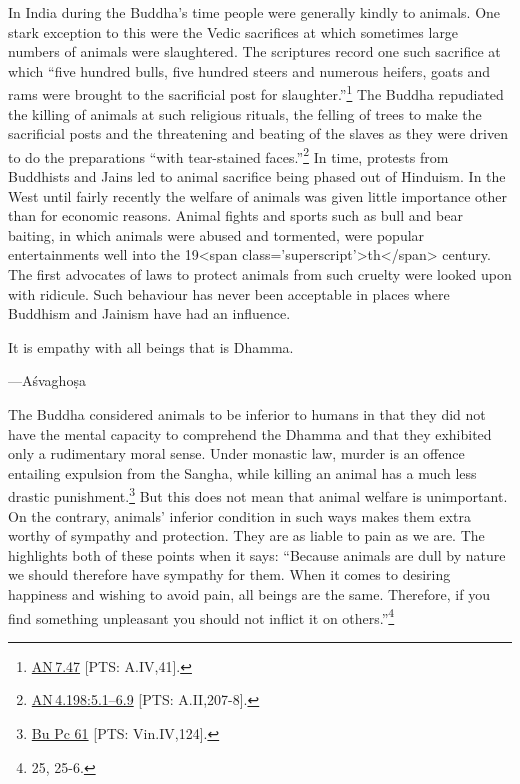 \documentclass[10pt, openright]{book}
\newenvironment{epigram-2}%
{%
\vspace{1em}
\noindent
\quoting[leftmargin=2.5cm,rightmargin=2.5cm]%
\begin{itshape}
\large
}%
{\end{itshape}\endquoting
}%
\newenvironment{epigram-2-cite}%
{%
\quoting[leftmargin=2.5cm,rightmargin=2.5cm]%
\noindent\normal\hspace*{\fill} 
}%
{\endquoting\vspace{1em}
}%
\begin{document}
In India during the Buddha’s time people were generally kindly to animals. One stark exception to this were the Vedic sacrifices at which sometimes large numbers of animals were slaughtered. The scriptures record one such sacrifice at which “five hundred bulls, five hundred steers and numerous heifers, goats and rams were brought to the sacrificial post for slaughter.”\footnote {\href{https://suttacentral.net/an7.47/en/sujato}{AN 7.47} [PTS: A.IV,41].} The Buddha repudiated the killing of animals at such religious rituals, the felling of trees to make the sacrificial posts and the threatening and beating of the slaves as they were driven to do the preparations “with tear-stained faces.”\footnote {\href{https://suttacentral.net/an4.198/en/sujato\#5.1}{AN 4.198:5.1–6.9} [PTS: A.II,207-8].} In time, protests from Buddhists and Jains led to animal sacrifice being phased out of Hinduism. In the West until fairly recently the welfare of animals was given little importance other than for economic reasons. Animal fights and sports such as bull and bear baiting, in which animals were abused and tormented, were popular entertainments well into the 19<span class='superscript'>th</span> century. The first advocates of laws to protect animals from such cruelty were looked upon with ridicule. Such behaviour has never been acceptable in places where Buddhism and Jainism have had an influence.


\begin{epigram-2}
It is empathy with all beings that is Dhamma.
\end{epigram-2}

\begin{epigram-2-cite}
—Aśvaghoṣa
\end{epigram-2-cite}

The Buddha considered animals to be inferior to humans in that they did not have the mental capacity to comprehend the Dhamma and that they exhibited only a rudimentary moral sense. Under monastic law, murder is an offence entailing expulsion from the Sangha, while killing an animal has a much less drastic punishment.\footnote {\href{https://suttacentral.net/pli-tv-bu-vb-pc61/en/brahmali}{Bu Pc 61} [PTS: Vin.IV,124].} But this does not mean that animal welfare is unimportant. On the contrary, animals’ inferior condition in such ways makes them extra worthy of sympathy and protection. They are as liable to pain as we are. The \cite{Jātakamāla} highlights both of these points when it says: “Because animals are dull by nature we should therefore have sympathy for them. When it comes to desiring happiness and wishing to avoid pain, all beings are the same. Therefore, if you find something unpleasant you should not inflict it on others.”\footnote {\cite{Jātakamāla} 25, 25-6.}
\end{document}
